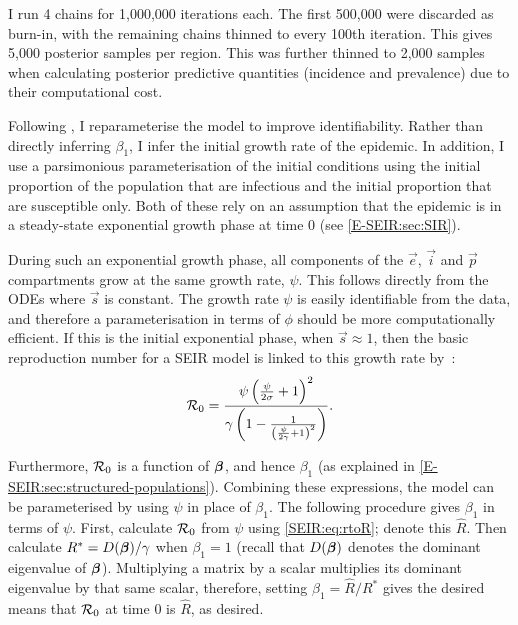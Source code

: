 \documentclass[thesis.tex]{subfiles}
\begin{document}
I run 4 chains for 1,000,000 iterations each.
The first 500,000 were discarded as burn-in, with the remaining chains thinned to every 100th iteration.
This gives 5,000 posterior samples per region.
This was further thinned to 2,000 samples when calculating posterior predictive quantities (incidence and prevalence) due to their computational cost.

Following \textcite{birrellBayesian}, I reparameterise the model to improve identifiability.
Rather than directly inferring $\beta_1$, I infer the initial growth rate of the epidemic.
In addition, I use a parsimonious parameterisation of the initial conditions using the initial proportion of the population that are infectious and the initial proportion that are susceptible only.
Both of these rely on an assumption that the epidemic is in a steady-state exponential growth phase at time 0 (see \cref{E-SEIR:sec:SIR}).

During such an exponential growth phase, all components of the $\vec{e}$, $\vec{i}$ and $\vec{p}$ compartments grow at the same growth rate, $\psi$.
This follows directly from the ODEs where $\vec{s}$ is constant. 
The growth rate $\psi$ is easily identifiable from the data, and therefore a parameterisation in terms of $\phi$ should be more computationally efficient.
If this is the initial exponential phase, when $\vec{s} \approx 1$, then the basic reproduction number for a SEIR model is linked to this growth rate by~\autocites{birrellBayesian}{wearingAppropriate}:
\begin{align}
    \mathcal{R}_{0} = \frac{\psi \left( \frac{\psi}{2\sigma} + 1 \right)^2}{\gamma \left(1 - \frac{1}{\left(\frac{\psi}{2 \gamma} + 1 \right)^2} \right)} \label{SEIR:eq:rtoR}.
\end{align}

Furthermore, $\mathcal{R}_{0}$ is a function of $\bm{\beta}$, and hence $\beta_1$ (as explained in \cref{E-SEIR:sec:structured-populations}).
Combining these expressions, the model can be parameterised by using $\psi$ in place of $\beta_1$.
The following procedure gives $\beta_1$ in terms of $\psi$.
First, calculate $\mathcal{R}_{0}$ from $\psi$ using \cref{SEIR:eq:rtoR}; denote this $\hat{R}$.
Then calculate $R^* = D(\bm{\beta}) / \gamma$ when $\beta_1=1$ (recall that $D(\bm{\beta})$ denotes the dominant eigenvalue of $\bm{\beta}$).
Multiplying a matrix by a scalar multiplies its dominant eigenvalue by that same scalar, therefore, setting $\beta_1 = \hat{R} / R^*$ gives the desired means that $\mathcal{R}_{0}$ at time 0 is $\hat{R}$, as desired.
\end{document}
